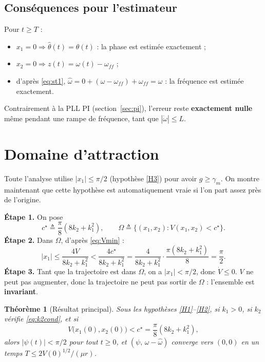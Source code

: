 \documentclass[11pt,a4paper]{article}
\numberwithin{equation}{section}
\theoremstyle{plain}
\newtheorem{theoreme}{Théorème}[section]
\theoremstyle{definition}
\theoremstyle{remark}
\newcommand{\hth}{\hat{\theta}}
\newcommand{\hw}{\hat{\omega}}
\newcommand{\wff}{\omega_{ff}}
\begin{document}
\subsection{Conséquences pour l'estimateur}
Pour $t\ge T$ :
\begin{itemize}
  \item $x_1=0\Rightarrow\hth(t)=\theta(t)$ : la phase est estimée exactement ;
  \item $x_2=0\Rightarrow z(t)=\omega(t)-\wff$ ;
  \item d'après \eqref{eq:st1}, $\hw = 0 + (\omega-\wff) + \wff = \omega$ : la fréquence est estimée exactement.
\end{itemize}
\begin{resultat}
Contrairement à la PLL PI (section~\ref{sec:pi}), l'erreur reste \textbf{exactement nulle} même pendant une
rampe de fréquence, tant que $|\dot\omega|\le L$.
\end{resultat}

\section{Domaine d'attraction}\label{sec:domaine}

Toute l'analyse utilise $|x_1|\le\pi/2$ (hypothèse \ref{H3}) pour avoir $g\ge\gamma_m$.
On montre maintenant que cette hypothèse est automatiquement vraie si l'on part assez près de l'origine.

\textbf{Étape 1.} On pose
\begin{equation}
c^\star\triangleq\frac{\pi}{8}(8k_2+k_1^2),\qquad \Omega\triangleq\{(x_1,x_2):V(x_1,x_2)<c^\star\}.
\end{equation}
\textbf{Étape 2.} Dans $\Omega$, d'après \eqref{eq:Vmin} :
\begin{equation}
|x_1|\le\frac{4V}{8k_2+k_1^2}<\frac{4c^\star}{8k_2+k_1^2} = \frac{4}{8k_2+k_1^2}\cdot\frac{\pi(8k_2+k_1^2)}{8} = \frac{\pi}{2}.
\end{equation}
\textbf{Étape 3.} Tant que la trajectoire est dans $\Omega$, on a $|x_1|<\pi/2$, donc $\dot V\le0$.
$V$ ne peut pas augmenter, donc la trajectoire ne peut pas sortir de $\Omega$ : l'ensemble est
\textbf{invariant}.

\begin{theoreme}[Résultat principal]
Sous les hypothèses \ref{H1}--\ref{H2}, si $k_1>0$, si $k_2$ vérifie \eqref{eq:k2cond}, et si
\begin{equation}
V\big(x_1(0),x_2(0)\big)<c^\star=\frac{\pi}{8}(8k_2+k_1^2),
\end{equation}
alors $|\psi(t)|<\pi/2$ pour tout $t\ge0$, et $(\psi,\,\omega-\hw)$ converge vers $(0,0)$ en un temps
$T\le 2V(0)^{1/2}/(\mu r)$.
\end{theoreme}
\end{document}
